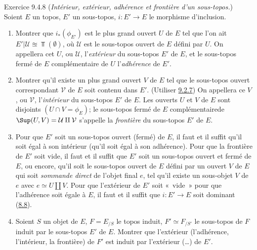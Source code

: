 \documentclass[10pt]{../fichiers-configuration-latex/smfart}
\begin{document}
\begin{enonce*}[remark]{Exercice 9.4.8}
(\emph{Intérieur, extérieur, adhérence et frontière d'un
sous-topos.}) Soient $E$ un topos, $E'$ un sous-topos,
$i:E'\rightarrow E$ le morphisme d'inclusion.
\begin{enumerate}
\renewcommand{\theenumi}{\alph{enumi}}
\renewcommand{\labelenumi}{\theenumi)}
\item Montrer que $i_{\ast}(\phi_{E'})$ est le plus grand ouvert $U$
de $E$ tel que l'on ait $E'| \mathcal{U} \approxeq \Top(∅)$, où
$\mathcal{U}$ est le sous-topos ouvert de $E$ défini par $U$. On
appellera cet $U$, ou $\mathcal{U}$, l'\emph{extérieur} du
sous-topos $E'$ de $E$, et le sous-topos fermé de $E$ complémentaire
de $U$ l'\emph{adhérence} de $E'$.

\item Montrer qu'il existe un plus grand ouvert $V$ de $E$ tel que le
sous-topos ouvert correspondant $\mathcal{V}$ de $E$ soit contenu
dans $E'$. (Utiliser \hyperref[IV.exer9.2.7]{9.2.7}) On appellera ce $V$, ou
$\mathcal{V}$, l'\emph{intérieur} du sous-topos $E'$ de $E$. Les
ouverts $U$ et $V$ de $E$ sont disjoints $(U\cap V=\phi_E)$; le
sous-topos fermé de $E$ complémentaire\pageoriginale de
$\Sup(U,V)=\mathcal{U}\amalg \mathcal{V}$ s'appelle la
\emph{frontière} du sous-topos $E'$ de $E$.

\item Pour que $E'$ soit un sous-topos ouvert (\resp fermé) de $E$, il
faut et il suffit qu'il soit égal à son intérieur (\resp qu'il soit
égal à son adhérence). Pour que la frontière de $E'$ soit vide, il
faut et il suffit que $E'$ soit un sous-topos ouvert et fermé de
$E$, ou encore, qu'il soit le sous-topos ouvert de $E$ défini par un
ouvert $V$ de $E$ qui soit \emph{sommande direct} de l'objet final
$e$, \ie tel qu'il existe un sous-objet $V$ de $e$ avec $e\simeq
U\amalg V$. Pour que l'extérieur de $E'$ soit « vide »  \ie pour
que l'adhérence soit égale à $E$, il faut et il suffit que
$i:E'\rightarrow E$ soit dominant (\hyperref[IV.exer8.8]{8.8}).

\item Soient $S$ un objet de $E$, $F=E_{/S}$ le topos induit, $F'\simeq
F_{/S'}$ le sous-topos de $F$ induit par le sous-topos $E'$ de $E$.
Montrer que l'extérieur (\resp l'adhérence, \resp
l'intérieur, \resp
la frontière) de $F'$ est induit par l'extérieur (\resp\ldots) de
$E'$.
\end{enumerate}
\end{enonce*}
\end{document}
